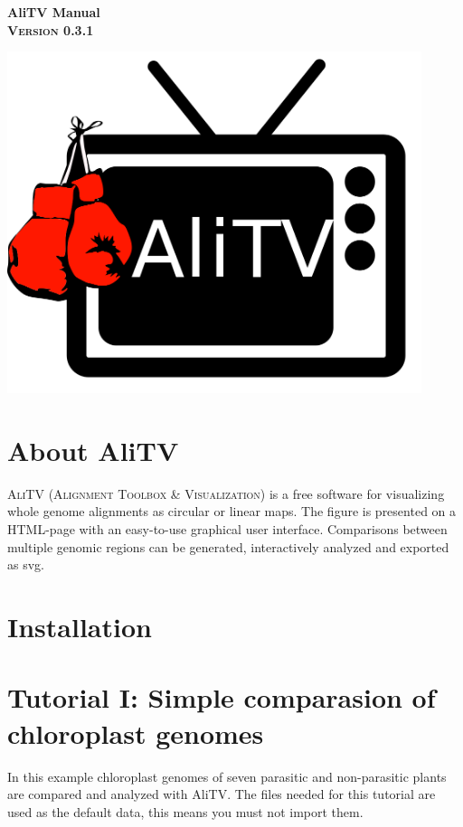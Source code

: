 \documentclass[a4paper]{scrartcl}
\begin{document}
\begin{titlepage}
    \begin{center}
    \huge \textbf{\textsf{AliTV Manual}} \\
    \vspace{0.5cm}
    \LARGE\textbf{\textsc{Version 0.3.1}}\\
    \vspace{1cm}
		\begin{center}
			\includegraphics[height=10cm]{AliTV_logo.png}
		\end{center}
    \end{center}
\end{titlepage}

\thispagestyle{empty}

\newpage
\section*{About AliTV}
\textsc{AliTV} (\textsc{Alignment Toolbox \& Visualization}) is a free software for visualizing whole genome alignments as circular or linear maps. The figure is presented on a HTML-page with an easy-to-use graphical user interface. Comparisons between multiple genomic regions can be generated, interactively analyzed and exported as svg. 

\section*{Installation}
\newpage
\section*{Tutorial I: Simple comparasion of chloroplast genomes}
In this example chloroplast genomes of seven parasitic and non-parasitic plants are compared and analyzed with AliTV. The files needed for this tutorial are used as the default data, this means you must not import them.
\end{document}
